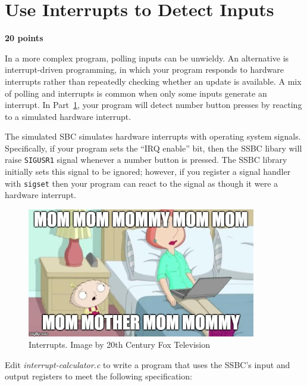 \documentclass[12pt]{article}
\begin{document}
\section{Use Interrupts to Detect Inputs} \label{interrupts}

\textbf{20 points}

In a more complex program, polling inputs can be unwieldy. An alternative is
interrupt-driven programming, in which your program responds to hardware
interrupts rather than repeatedly checking whether an update is available. A
mix of polling and interrupts is common when only some inputs generate an
interrupt. In Part~\ref{interrupts}, your program will detect number button
presses by reacting to a simulated hardware interrupt.

The simulated SBC simulates hardware interrupts with operating system signals.
Specifically, if your program sets the ``IRQ enable'' bit, then the SSBC libary
will raise \texttt{SIGUSR1} signal whenever a number button is pressed. The
SSBC library initially sets this signal to be ignored; however, if you register
a signal handler with \texttt{sigset} then your program can react to the signal
as though it were a hardware interrupt.

\begin{figure}
    \centering
    \includegraphics[width=10cm]{MomMomMom}
    \caption{Interrupts. \tiny Image by 20th Century Fox Television}
\end{figure}

Edit \textit{interrupt-calculator.c} to write a program that uses the SSBC's
input and output registers to meet the following specification:
\end{document}
